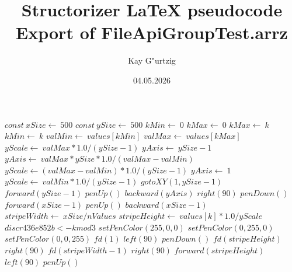 \documentclass[a4paper,10pt]{article}
\title{Structorizer LaTeX pseudocode Export of FileApiGroupTest.arrz}
\author{Kay G"urtzig}
\date{04.05.2026}
\begin{document}
\begin{algorithm}
\caption{drawBarChart(values, nValues)}
\begin{algorithmic}[5]

\STATE {}
\STATE {}
\STATE {}
\STATE {}
  \STATE \(const\ xSize\gets\ 500\)
  \STATE \(const\ ySize\gets\ 500\)
  \STATE \(kMin\gets\ 0\)
  \STATE \(kMax\gets\ 0\)
      \STATE \(kMax\gets\ k\)
    \ELSE
        \STATE \(kMin\gets\ k\)
      \ENDIF
    \ENDIF
  \ENDFOR
  \STATE \(valMin\gets\ values[kMin]\)
  \STATE \(valMax\gets\ values[kMax]\)
  \STATE \(yScale\gets\ valMax*1.0/(ySize-1)\)
  \STATE \(yAxis\gets\ ySize-1\)
      \STATE \(yAxis\gets\ valMax*ySize*1.0/(valMax-valMin)\)
      \STATE \(yScale\gets(valMax-valMin)*1.0/(ySize-1)\)
    \ELSE
      \STATE \(yAxis\gets\ 1\)
      \STATE \(yScale\gets\ valMin*1.0/(ySize-1)\)
    \ENDIF
  \ENDIF
  \STATE \(gotoXY(1,ySize-1)\)
  \STATE \(forward(ySize-1)\)
  \STATE \(penUp()\)
  \STATE \(backward(yAxis)\)
  \STATE \(right(90)\)
  \STATE \(penDown()\)
  \STATE \(forward(xSize-1)\)
  \STATE \(penUp()\)
  \STATE \(backward(xSize-1)\)
  \STATE \(stripeWidth\gets\ xSize/nValues\)
    \STATE \(stripeHeight\gets\ values[k]*1.0/yScale\)
    \STATE \(discr436e852b <- k mod 3\)
      \STATE \(setPenColor(255,0,0)\)
      \STATE \(setPenColor(0,255,0)\)
      \STATE \(setPenColor(0,0,255)\)
    \ENDIF
    \STATE \(fd(1)\)
    \STATE \(left(90)\)
    \STATE \(penDown()\)
    \STATE \(fd(stripeHeight)\)
    \STATE \(right(90)\)
    \STATE \(fd(stripeWidth-1)\)
    \STATE \(right(90)\)
    \STATE \(forward(stripeHeight)\)
    \STATE \(left(90)\)
    \STATE \(penUp()\)
  \ENDFOR

\end{algorithmic}
\end{algorithm}
\end{document}
